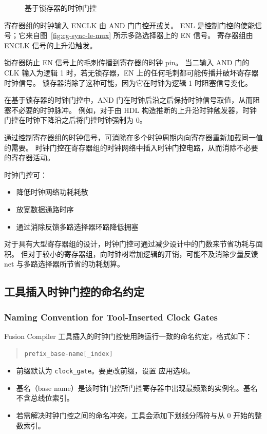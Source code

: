 \begin{figure}[htbp]
\centering
{}
\caption{基于锁存器的时钟门控}
\label{fig:cg-latch-based}
\end{figure}

寄存器组的时钟输入 ENCLK 由 AND 门门控开或关。
ENL 是控制门控的使能信号；它来自图~\ref{fig:cg-sync-le-mux} 所示多路选择器上的 EN 信号。
寄存器组由 ENCLK 信号的上升沿触发。

锁存器防止 EN 信号上的毛刺传播到寄存器的时钟 pin。
当二输入 AND 门的 CLK 输入为逻辑 1 时，若无锁存器，EN 上的任何毛刺都可能传播并破坏寄存器时钟信号。
锁存器消除了这种可能，因为它在时钟为逻辑 1 时阻塞信号变化。

在基于锁存器的时钟门控中，AND 门在时钟后沿之后保持时钟信号取值，从而阻塞不必要的时钟脉冲。
例如，对于由 HDL 构造推断的上升沿时钟触发器，时钟门控在时钟下降沿之后将门控时钟强制为 0。

通过控制寄存器组的时钟信号，可消除在多个时钟周期内向寄存器重新加载同一值的需要。
时钟门控在寄存器组的时钟网络中插入时钟门控电路，从而消除不必要的寄存器活动。

时钟门控可：
\begin{itemize}
  \item 降低时钟网络功耗耗散
  \item 放宽数据通路时序
  \item 通过消除反馈多路选择器环路降低拥塞
\end{itemize}

对于具有大型寄存器组的设计，时钟门控可通过减少设计中的门数来节省功耗与面积。
但对于较小的寄存器组，向时钟树增加逻辑的开销，可能不及消除少量反馈 net 与多路选择器所节省的功耗划算。

\subsection{工具插入时钟门控的命名约定}
\subsubsection*{Naming Convention for Tool-Inserted Clock Gates}

Fusion Compiler 工具插入的时钟门控使用跨运行一致的命名约定，格式如下：
\begin{quote}
\texttt{prefix\_base-name[\_index]}
\end{quote}
\begin{itemize}
  \item 前缀默认为 \texttt{clock\_gate}。要更改前缀，设置  应用选项。
  \item 基名（base name）是该时钟门控所门控寄存器中出现最频繁的实例名。基名不含总线位索引。
  \item 若需解决时钟门控之间的命名冲突，工具会添加下划线分隔符与从 0 开始的整数索引。
\end{itemize}

